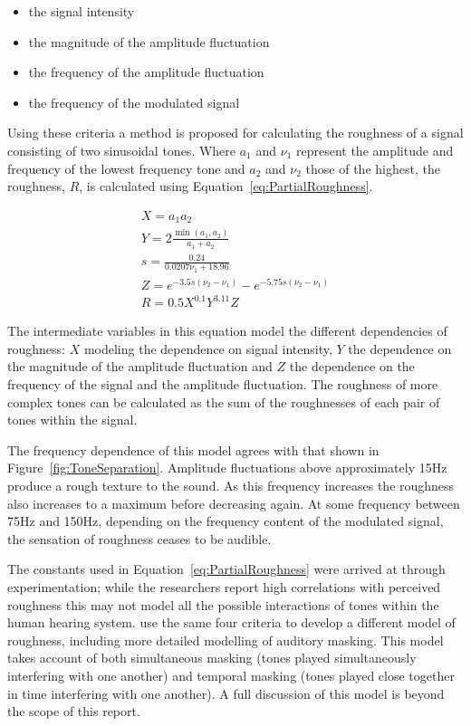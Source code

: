		\begin{itemize}
			\item the signal intensity
			\item the magnitude of the amplitude fluctuation
			\item the frequency of the amplitude fluctuation
			\item the frequency of the modulated signal
		\end{itemize}

		Using these criteria a method is proposed for calculating the roughness of a signal consisting of two
		sinusoidal tones. Where $a_{1}$ and $\nu_{1}$ represent the amplitude and frequency of the lowest frequency
		tone and $a_{2}$ and $\nu_{2}$ those of the highest, the roughness, $R$, is calculated using
		Equation~\ref{eq:PartialRoughness}.
		
		\begin{gather}
			X = a_{1}a_{2} \nonumber \\
			Y = 2\frac{\min(a_{1}, a_{2})}{a_{1} + a_{2}} \nonumber \\
			s = \frac{0.24}{0.0207\nu_{1} + 18.96} \nonumber \\
			Z = e^{-3.5s(\nu_{2} - \nu_{1})} - e^{-5.75s(\nu_{2} - \nu_{1})} \nonumber \\
			R = 0.5X^{0.1}Y^{3.11}Z
			\label{eq:PartialRoughness}
		\end{gather}

		The intermediate variables in this equation model the different dependencies of roughness: $X$ modeling the
		dependence on signal intensity, $Y$ the dependence on the magnitude of the amplitude fluctuation and $Z$
		the dependence on the frequency of the signal and the amplitude fluctuation. The roughness of more complex
		tones can be calculated as the sum of the roughnesses of each pair of tones within the signal. 
		
		The frequency dependence of this model agrees with that shown in Figure~\ref{fig:ToneSeparation}. Amplitude
		fluctuations above approximately 15Hz produce a rough texture to the sound. As this frequency increases the
		roughness also increases to a maximum before decreasing again. At some frequency between 75Hz and 150Hz,
		depending on the frequency content of the modulated signal, the sensation of roughness ceases to be
		audible.

		The constants used in Equation~\ref{eq:PartialRoughness} were arrived at through experimentation; while the
		researchers report high correlations with perceived roughness this may not model all the possible
		interactions of tones within the human hearing system. \citet{fastl2007psychoacoustics} use the same four
		criteria to develop a different model of roughness, including more detailed modelling of auditory masking.
		This model takes account of both simultaneous masking (tones played simultaneously interfering with one
		another) and temporal masking (tones played close together in time interfering with one another). A full
		discussion of this model is beyond the scope of this report.

